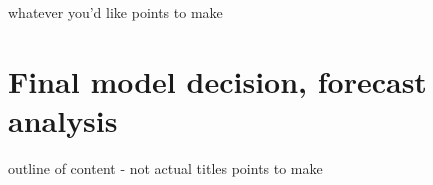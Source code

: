 \documentclass[ignorenonframetext]{beamer}
\begin{document}
  	\begin{frame}{whatever you'd like}
  		points to make
  	\end{frame}
 
 
 \section{Final model decision, forecast analysis}
  	\begin{frame}{outline of content - not actual titles}
  		points to make
  	\end{frame}
 
     
\end{document}
